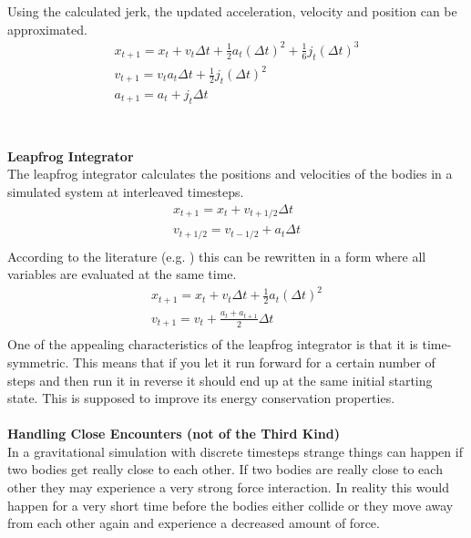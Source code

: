 \documentclass[11pt]{article} %
\begin{document}
Using the calculated jerk, the updated acceleration, velocity and position can be approximated.
\begin{equation}
    \begin{split}
        x_{t+ 1} = x_t + v_t \Delta t + \frac{1}{2} a_t (\Delta t)^2 + \frac{1}{6} j_t (\Delta t)^3 \\
        v_{t+ 1} = v_t a_t \Delta t + \frac{1}{2} j_t (\Delta t)^2 \\
        a_{t+ 1} = a_t + j_t \Delta t \\
    \end{split}
\end{equation}
\\\\
\textbf{Leapfrog Integrator}\\
The leapfrog integrator calculates the positions and velocities of the bodies in a simulated system at interleaved timesteps. 
\begin{equation}
    \begin{split}
        x_{t+ 1} = x_t + v_{t+1/2} \Delta t \\
        v_{t+ 1/2} = v_{t-1/2} + a_t \Delta t \\
    \end{split}
\end{equation}
According to the literature (e.g. \cite{1995ApJ...443L..93H}) this can be rewritten in a form where all variables are evaluated at the same time.
\begin{equation}
    \begin{split}
        x_{t+ 1} = x_t + v_t \Delta t  + \frac{1}{2} a_t (\Delta t)^2\\
        v_{t+ 1} = v_t + \frac{a_t + a_{t+1}}{2} \Delta t \\
    \end{split}
\end{equation}
One of the appealing characteristics of the leapfrog integrator is that it is time-symmetric. This means that if you let it run forward for a certain number of steps and then run it in reverse it should end up at the same initial starting state. This is supposed to improve its energy conservation properties.
\\\\
\textbf{Handling Close Encounters (not of the Third Kind)}\\
In a gravitational simulation with discrete timesteps strange things can happen if two bodies get really close to each other. If two bodies are really close to each other they may experience a very strong force interaction. In reality this would happen for a very short time before the bodies either collide or they move away from each other again and experience a decreased amount of force.\\
\end{document}
